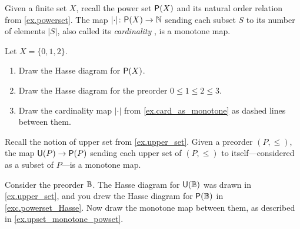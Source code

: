 \documentclass[7Sketches]{subfiles}
\begin{document}
\begin{example}%
\label{ex.card_as_monotone}
  Given a finite set $X$, recall the power set $\mathsf{P}(X)$ and its natural
  order relation from \cref{ex.powerset}. The map $\lvert\cdot\rvert\colon \mathsf{P}(X) \to \mathbb{N}$ sending
  each subset $S$ to its number of elements $\lvert S\rvert$, also called its
  \emph{cardinality}%
, is a monotone map.%
\end{example}

\begin{exercise}%
\label{exc.card_as_monotone}
Let $X=\{0,1,2\}$.
\begin{enumerate}
	\item Draw the Hasse diagram for $\mathsf{P}(X)$.
	\item Draw the Hasse diagram for the preorder $0\leq 1\leq 2\leq 3$.
	\item Draw the cardinality map $\lvert \cdot \rvert$ from \cref{ex.card_as_monotone} as dashed lines between them.
\qedhere
\end{enumerate}
\end{exercise}

\begin{example}%
\label{ex.upset_monotone_powset}
  Recall the notion of upper set from \cref{ex.upper_set}. Given a preorder
  $(P,\le)$, the map $\mathsf{U}(P) \to \mathsf{P}(P)$ sending each upper set of
  $(P,\le)$ to itself---considered as a subset of $P$---is a monotone map.
\end{example}

\begin{exercise}%
\label{exc.upset_monotone_powset}
Consider the preorder $\mathbb{B}$. The Hasse diagram for $\mathsf{U}(\mathbb{B})$ was drawn in \cref{ex.upper_set}, and you drew the Hasse diagram for $\mathsf{P}(\mathbb{B})$ in \cref{exc.powerset_Hasse}. Now draw the monotone map between them, as described in \cref{ex.upset_monotone_powset}.
\end{exercise}
\end{document}
